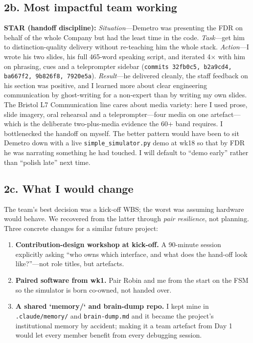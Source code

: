 \subsection*{2b. Most impactful team working }
\www \textbf{STAR (handoff discipline):} \emph{Situation}---Demetro was presenting the FDR on behalf of the whole Company but had the least time in the code. \emph{Task}---get him to distinction-quality delivery without re-teaching him the whole stack. \emph{Action}---I wrote his two slides, his full 465-word speaking script, and iterated 4$\times$ with him on phrasing, cues and a teleprompter sidebar (\texttt{commits 32fb0c5, b2a9cd4, ba667f2, 9b826f8, 7920e5a}). \emph{Result}---he delivered cleanly, the staff feedback on his section was positive, and I learned more about clear engineering communication by ghost-writing for a non-expert than by writing my own slides. The Bristol L7 Communication line cares about media variety: here I used prose, slide imagery, oral rehearsal and a teleprompter---four media on one artefact---which is the deliberate two-plus-media evidence the 60+ band requires.
\ebi I bottlenecked the handoff on myself. The better pattern would have been to sit Demetro down with a live \texttt{simple\_simulator.py} demo at wk18 so that by FDR he was narrating something he had touched. I will default to ``demo early'' rather than ``polish late'' next time.

\subsection*{2c. What I would change }
\www The team's best decision was a kick-off WBS; the worst was assuming hardware would behave. We recovered from the latter through \emph{pair resilience}, not planning.
\ebi Three concrete changes for a similar future project:
\begin{enumerate}
\item \textbf{Contribution-design workshop at kick-off.} A 90-minute session explicitly asking ``who owns which interface, and what does the hand-off look like?''---not role titles, but artefacts.
\item \textbf{Paired software from wk1.} Pair Robin and me from the start on the FSM so the simulator is born co-owned, not handed over.
\item \textbf{A shared `memory/` and brain-dump repo.} I kept mine in \texttt{.claude/memory/} and \texttt{brain-dump.md} and it became the project's institutional memory by accident; making it a team artefact from Day 1 would let every member benefit from every debugging session.
\end{enumerate}

